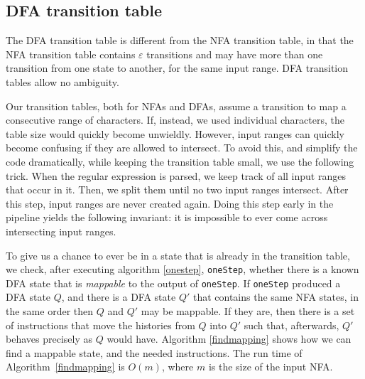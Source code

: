 \documentclass[english]{sigplanconf}
\theoremstyle{definition}
\begin{document}
\subsection{DFA transition table}
The DFA transition table is different from the NFA transition table,
in that the NFA transition table contains $\varepsilon$ transitions and
may have more than one transition from one state to another, for
the same input range. DFA transition tables allow no ambiguity.

Our transition tables, both for NFAs and DFAs, assume a transition
to map a consecutive range of characters. If, instead, we used
individual characters, the table size would quickly become unwieldly.
However, input ranges can quickly become confusing if they are
allowed to intersect. To avoid this, and simplify the code dramatically,
while keeping the transition table small, we use the following
trick. When the regular expression is parsed, we keep track of all
input ranges that occur in it. Then, we split them until no two
input ranges intersect.  After this step, input ranges are never
created again.  Doing this step early in the pipeline yields the
following invariant: it is impossible to ever come across intersecting
input ranges.

To give us a chance to ever be in a state that is already in the
transition table, we check, after executing algorithm \ref{onestep},
\texttt{oneStep}, whether there is a known DFA state that is
\emph{mappable} to the output of \texttt{oneStep}.  If \texttt{oneStep}
produced a DFA state $Q$, and there is a DFA state $Q'$ that contains
the same NFA states, in the same order then $Q$ and $Q'$ may be
mappable.  If they are, then there is a set of instructions that
move the histories from $Q$ into $Q'$ such that, afterwards, $Q'$
behaves precisely as $Q$ would have. Algorithm \ref{findmapping}
shows how we can find a mappable state, and the needed instructions.
The run time of Algorithm~\ref{findmapping} is $O(m)$, where $m$
is the size of the input NFA.
\end{document}
